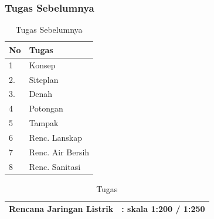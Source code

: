 \documentclass[../main.tex]{subfiles}
\begin{document}
\begin{frame}[mytitle=standard,t,mycolor=digiPH_purple,dark]
	\frametitle{Tugas Sebelumnya}
	\begin{table}[htb]
		\caption{Tugas Sebelumnya}
		\begin{tabularx}{\textwidth}{|p{1cm}|X|}
			\hline
			\textbf{No} & \textbf{Tugas}   \\ \hline
			1           & Konsep           \\ \hline
			2.          & Siteplan         \\\hline
			3.          & Denah            \\\hline
			4           & Potongan         \\ \hline
			5           & Tampak           \\ \hline
			6           & Renc. Lanskap    \\ \hline
			7           & Renc. Air Bersih \\ \hline
			8           & Renc. Sanitasi   \\ \hline
		\end{tabularx}
	\end{table}
\end{frame}


\begin{frame}[mytitle=standard,c,mycolor=digiPH_uniblue,light]
	\begin{table}
		\caption{Tugas}\label{tab:}
		\begin{center}
			\begin{tabular}[c]{lp{}}
				\hline
				Rencana Jaringan Listrik & : skala 1:200 / 1:250 \\
				\hline
			\end{tabular}
		\end{center}
	\end{table}
\end{frame}




\end{document}
